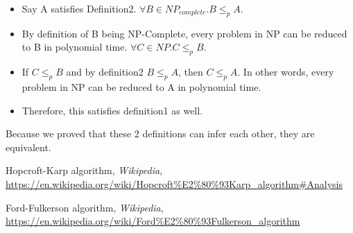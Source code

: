 \documentclass{article}
\begin{document}
\begin{enumerate}
    \begin{itemize}
        \item Say A satisfies Definition2. $\forall B\in NP_{complete}.B\leq_pA$.
        \item By definition of B being NP-Complete, every problem in NP can be reduced to B in polynomial time. $\forall C\in NP.C\leq_p B$.
        \item If $C\leq_p B$ and by definition2 $B\leq_p A$, then $C\leq_p A$.
        In other words, every problem in NP can be reduced to A in polynomial time.
        \item Therefore, this satisfies definition1 as well.
    \end{itemize}

    Because we proved that these 2 definitions can infer each other, they are equivalent.
    
\end{enumerate}

\begin{thebibliography}{9}
    
    Hopcroft-Karp algorithm, \emph{Wikipedia}, \url{https://en.wikipedia.org/wiki/Hopcroft%E2%80%93Karp_algorithm#Analysis}
    
    Ford-Fulkerson algorithm, \emph{Wikipedia}, \url{https://en.wikipedia.org/wiki/Ford%E2%80%93Fulkerson_algorithm}

    
    
    \end{thebibliography}
\end{document}
